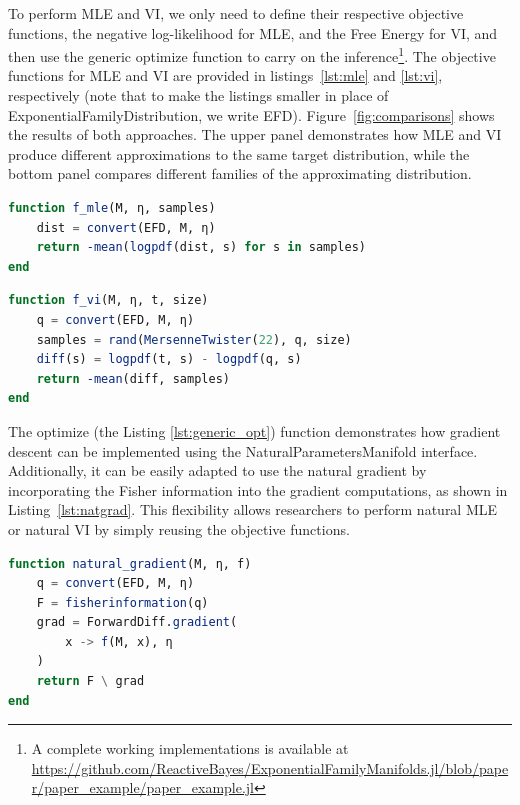 \documentclass{juliacon}
\newcommand{\code}[1]{\textsf{#1}}
\begin{document}
To perform MLE and VI, we only need to define their respective objective functions, the negative log-likelihood for MLE, and the Free Energy for VI, and then use the generic \code{optimize} function to carry on the inference\footnote{A complete working implementations is available at \url{https://github.com/ReactiveBayes/ExponentialFamilyManifolds.jl/blob/paper/paper_example/paper_example.jl}}. The objective functions for MLE and VI are provided in listings~\ref{lst:mle} and \ref{lst:vi}, respectively (note that to make the listings smaller in place of \code{ExponentialFamilyDistribution}, we write \code{EFD}). Figure~\ref{fig:comparisons} shows the results of both approaches. The upper panel demonstrates how MLE and VI produce different approximations to the same target distribution, while the bottom panel compares different families of the approximating distribution.
\vspace{-0.5em}
\begin{lstlisting}[language=Julia, caption={Objective functions for MLE}, label={lst:mle}]
function f_mle(M, η, samples)
    dist = convert(EFD, M, η)
    return -mean(logpdf(dist, s) for s in samples)
end
\end{lstlisting}
\vspace{-0.5em}
\begin{lstlisting}[language=Julia, caption={Objective functions for VI}, label={lst:vi}]
function f_vi(M, η, t, size)
    q = convert(EFD, M, η)
    samples = rand(MersenneTwister(22), q, size)
    diff(s) = logpdf(t, s) - logpdf(q, s)
    return -mean(diff, samples)
end
\end{lstlisting}
\vspace{1em}
The \code{optimize} (the Listing \ref{lst:generic_opt}) function demonstrates how gradient descent can be implemented using the \code{NaturalParametersManifold} interface. Additionally, it can be easily adapted to use the natural gradient \cite{amari_natural_1998} by incorporating the Fisher information into the gradient computations, as shown in Listing~\ref{lst:natgrad}. This flexibility allows researchers to perform natural MLE or natural VI by simply reusing the objective functions.

\begin{lstlisting}[language=Julia, label={lst:natgrad}, caption={Implementing the natural gradient}]
function natural_gradient(M, η, f)
    q = convert(EFD, M, η)
    F = fisherinformation(q)
    grad = ForwardDiff.gradient(
        x -> f(M, x), η
    )
    return F \ grad
end
\end{lstlisting}
\end{document}
